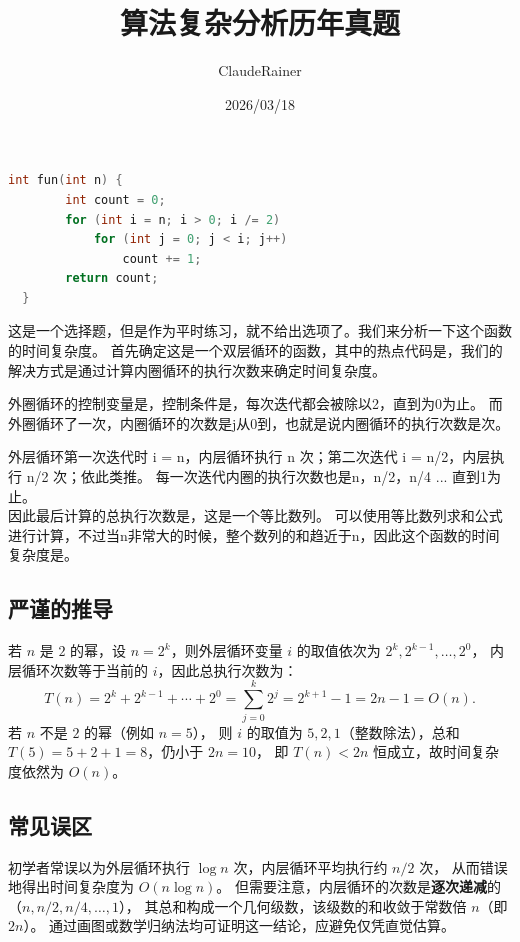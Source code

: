 \documentclass[b5paper,11pt]{article}
\title{算法复杂分析历年真题}
\author{ClaudeRainer}
\date{2026/03/18}
\begin{document}
\maketitle


\begin{lstlisting}[language=C]
    int fun(int n) {
        int count = 0;
        for (int i = n; i > 0; i /= 2)
            for (int j = 0; j < i; j++)
                count += 1;
        return count;
  }
  \end{lstlisting}
这是一个选择题，但是作为平时练习，就不给出选项了。我们来分析一下这个函数的时间复杂度。
首先确定这是一个双层循环的函数，其中的热点代码是，我们的解决方式是通过计算内圈循环的执行次数来确定时间复杂度。

外圈循环的控制变量是，控制条件是，每次迭代都会被除以2，直到为0为止。
而外圈循环了一次，内圈循环的次数是j从0到，也就是说内圈循环的执行次数是次。

\vspace{1.0em}

外层循环第一次迭代时 i = n，内层循环执行 n 次；第二次迭代 i = n/2，内层执行 n/2 次；依此类推。
每一次迭代内圈的执行次数也是n，n/2，n/4 ... 直到1为止。\\
因此最后计算的总执行次数是，这是一个等比数列。
可以使用等比数列求和公式进行计算，不过当n非常大的时候，整个数列的和趋近于n，因此这个函数的时间复杂度是。

\subsection*{严谨的推导}

若 $n$ 是 $2$ 的幂，设 $n = 2^k$，则外层循环变量 $i$ 的取值依次为 $2^k, 2^{k-1}, \dots, 2^0$，
内层循环次数等于当前的 $i$，因此总执行次数为：
\[
  T(n) = 2^k + 2^{k-1} + \cdots + 2^0
  = \sum_{j=0}^{k} 2^j = 2^{k+1} - 1 = 2n - 1 = O(n).
\]
若 $n$ 不是 $2$ 的幂（例如 $n = 5$），
则 $i$ 的取值为 $5, 2, 1$（整数除法），总和 $T(5) = 5 + 2 + 1 = 8$，仍小于 $2n = 10$，
即 $T(n) < 2n$ 恒成立，故时间复杂度依然为 $O(n)$。

\subsection*{常见误区}

初学者常误以为外层循环执行 $\log n$ 次，内层循环平均执行约 $n/2$ 次，
从而错误地得出时间复杂度为 $O(n \log n)$。
但需要注意，内层循环的次数是\textbf{逐次递减}的（$n, n/2, n/4, \dots, 1$），
其总和构成一个几何级数，该级数的和收敛于常数倍 $n$（即 $2n$）。
通过画图或数学归纳法均可证明这一结论，应避免仅凭直觉估算。
\end{document}
